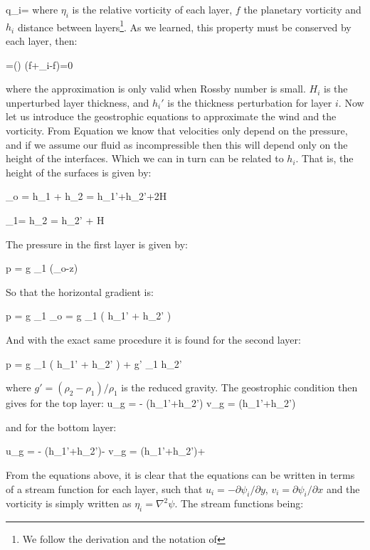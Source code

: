 \beq
q_i=
where $\eta_i$ is the relative vorticity of each layer, $f$ the planetary vorticity and $h_i$ distance between layers\footnote{We follow the derivation and the notation of }. As we learned, this property must be conserved by each layer, then:

\beq
{}=\left(\right) \simeq {}\left(f+\eta_i-f\right)=0

where the approximation is only valid when Rossby number is small. $H_i$ is the unperturbed layer thickness, and $h_i'$ is the thickness perturbation for layer $i$. Now let us introduce the geostrophic equations to approximate the wind and the vorticity. From Equation  we know that velocities only depend on the pressure, and if we assume our fluid as incompressible then this will depend only on the height of the interfaces. Which we can in turn can be related to $h_i$. That is, the height of the surfaces is given by:

\beq
\eta_o = h_1 + h_2 = h_1'+h_2'+2H

\beq
\eta_1= h_2 = h_2' + H

The pressure in the first layer is given by:

\beq
p = g \rho_1 (\eta_o-z)

So that the horizontal gradient is:

\beq
\nabla p = g \rho_1 \nabla \eta_o = g \rho_1 ( \nabla h_1' + \nabla h_2' )

And with the exact same procedure it is found for the second layer:

\beq
\nabla p =  g \rho_1 ( \nabla h_1' + \nabla h_2' ) + g' \rho_1 \nabla h_2'

where $g'=(\rho_2-\rho_1)/\rho_1$ is the reduced gravity. The geostrophic condition then gives for the top layer:
\beq
u_g = - (h_1'+h_2')
\beq
v_g =  (h_1'+h_2')

and for the bottom layer:

\beq
u_g = - (h_1'+h_2')- 
\beq
v_g =  (h_1'+h_2')+ 

From the equations above, it is clear that the equations can be written in terms of a stream function for each layer, such that $u_i=-\partial \psi_i / \partial y$, $v_i=\partial \psi_i / \partial x$ and the vorticity is simply written as $\eta_i = \nabla ^2 \psi$. The stream functions being:

